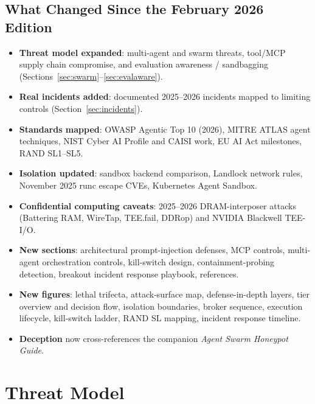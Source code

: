 \documentclass[11pt,letterpaper]{article}
\begin{document}
\subsection{What Changed Since the February 2026 Edition}

\begin{changebox}
\begin{itemize}
  \item \textbf{Threat model expanded}: multi-agent and swarm threats, tool/MCP supply chain compromise, and evaluation awareness / sandbagging (Sections~\ref{sec:swarm}--\ref{sec:evalaware}).
  \item \textbf{Real incidents added}: documented 2025--2026 incidents mapped to limiting controls (Section~\ref{sec:incidents}).
  \item \textbf{Standards mapped}: OWASP Agentic Top 10 (2026), MITRE ATLAS agent techniques, NIST Cyber AI Profile and CAISI work, EU AI Act milestones, RAND SL1--SL5.
  \item \textbf{Isolation updated}: sandbox backend comparison, Landlock network rules, November 2025 runc escape CVEs, Kubernetes Agent Sandbox.
  \item \textbf{Confidential computing caveats}: 2025--2026 DRAM-interposer attacks (Battering RAM, WireTap, TEE.fail, DDRop) and NVIDIA Blackwell TEE-I/O.
  \item \textbf{New sections}: architectural prompt-injection defenses, MCP controls, multi-agent orchestration controls, kill-switch design, containment-probing detection, breakout incident response playbook, references.
  \item \textbf{New figures}: lethal trifecta, attack-surface map, defense-in-depth layers, tier overview and decision flow, isolation boundaries, broker sequence, execution lifecycle, kill-switch ladder, RAND SL mapping, incident response timeline.
  \item \textbf{Deception} now cross-references the companion \emph{Agent Swarm Honeypot Guide}.
\end{itemize}
\end{changebox}


\section{Threat Model}
\label{sec:threat}
\end{document}
